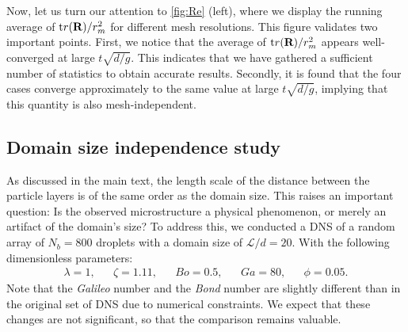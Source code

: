Now, let us turn our attention to \ref{fig:Re} (left), where we display the running average of $\text tr(\textbf{R})/r_m^2$ for different mesh resolutions.  
This figure validates two important points. 
First, we notice that the average of $\text tr(\textbf{R})/r_m^2$ appears well-converged at large $t\sqrt{d/g}$. 
This indicates that we have gathered a sufficient number of statistics to obtain accurate results. 
Secondly, it is found that the four cases converge approximately to the same value at large  $t\sqrt{d/g}$, implying that this quantity is also mesh-independent. 

\subsection{ Domain size independence study}
\label{ap:domain_independence_study}
As discussed in the main text, the length scale of the distance between the particle layers is of the same order as the domain size. 
This raises an important question: Is the observed microstructure a physical phenomenon, or merely an artifact of the domain's size?
To address this, we conducted a DNS of a random array of $N_b=800$ droplets with a domain size of $\mathcal{L}/d = 20$. With the following dimensionless parameters:
\begin{align*}
    \lambda = 1,
    && \zeta = 1.11,
    && Bo = 0.5,
    && Ga = 80,
    && \phi = 0.05. 
\end{align*}
Note that the \textit{Galileo} number and the \textit{Bond} number are slightly different than in the original set of DNS due to numerical constraints.
We expect that these changes are not significant, so that the comparison remains valuable.



